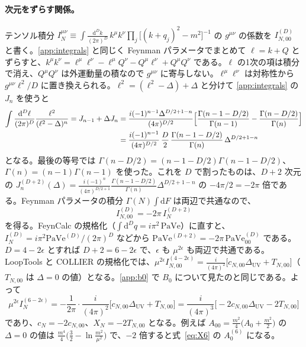 \documentclass[a4paper,10pt]{ltjsarticle}
\newcommand{\dd}{\mathrm{d}}
\begin{document}
\paragraph{次元をずらす関係。}テンソル積分 $I_N^{\mu\nu}\equiv\int\frac{\dd^Dk}{(2\pi)^D}\,k^\mu k^\nu\prod_j\bigl[(k+q_j)^2-m^2\bigr]^{-1}$ の $g^{\mu\nu}$ の係数を $I_{N,00}^{(D)}$ と書く。\ref{app:integrals} と同じく Feynman パラメータでまとめて $\ell=k+Q$ とずらすと、$k^\mu k^\nu=\ell^\mu\ell^\nu-\ell^\mu Q^\nu-Q^\mu\ell^\nu+Q^\mu Q^\nu$ である。$\ell$ の1次の項は積分で消え、$Q^\mu Q^\nu$ は外運動量の積なので $g^{\mu\nu}$ に寄与しない。$\ell^\mu\ell^\nu$ は対称性から $g^{\mu\nu}\ell^2/D$ に置き換えられる。$\ell^2=(\ell^2-\Delta)+\Delta$ と分けて \ref{app:integrals} の $J_n$ を使うと
\begin{align*}
\int\frac{\dd^D\ell}{(2\pi)^D}\frac{\ell^2}{(\ell^2-\Delta)^n}=J_{n-1}+\Delta J_n
&=\frac{i(-1)^{n-1}\Delta^{D/2+1-n}}{(4\pi)^{D/2}}\Bigl[\frac{\Gamma(n-1-D/2)}{\Gamma(n-1)}-\frac{\Gamma(n-D/2)}{\Gamma(n)}\Bigr]\\
&=\frac{i(-1)^{n-1}}{(4\pi)^{D/2}}\,\frac{D}{2}\,\frac{\Gamma(n-1-D/2)}{\Gamma(n)}\,\Delta^{D/2+1-n}
\end{align*}
となる。最後の等号では $\Gamma(n-D/2)=(n-1-D/2)\Gamma(n-1-D/2)$、$\Gamma(n)=(n-1)\Gamma(n-1)$ を使った。これを $D$ で割ったものは、$D+2$ 次元の $J_n^{(D+2)}(\Delta)=\frac{i(-1)^n}{(4\pi)^{D/2+1}}\frac{\Gamma(n-1-D/2)}{\Gamma(n)}\Delta^{D/2+1-n}$ の $-4\pi/2=-2\pi$ 倍である。Feynman パラメータの積分 $\Gamma(N)\int\dd F$ は両辺で共通なので、
\begin{equation*}
I_{N,00}^{(D)}=-2\pi\,I_N^{(D+2)}
\end{equation*}
を得る。FeynCalc の規格化（$\int\dd^Dq=i\pi^2\,\mathrm{PaVe}$）に直すと、$I_N^{(D)}=i\pi^2\mathrm{PaVe}^{(D)}/(2\pi)^D$ などから $\mathrm{PaVe}^{(D+2)}=-2\pi\,\mathrm{PaVe}_{00}^{(D)}$ である。$D=4-2\epsilon$ とすれば $D+2=6-2\epsilon$ で、$\epsilon$ も $\mu^{2\epsilon}$ も両辺で共通である。LoopTools と COLLIER の規格化では、$\mu^{2\epsilon}I_{N,00}^{(4-2\epsilon)}=\frac{i}{(4\pi)^2}\bigl[c_{N,00}\Delta_{\mathrm{UV}}+T_{N,00}\bigr]$（$T_{N,00}$ は $\Delta=0$ の値）となる。\ref{app:b0} で $B_0$ について見たのと同じである。よって
\begin{equation*}
\mu^{2\epsilon}I_N^{(6-2\epsilon)}=-\frac{1}{2\pi}\cdot\frac{i}{(4\pi)^2}\bigl[c_{N,00}\Delta_{\mathrm{UV}}+T_{N,00}\bigr]=\frac{i}{(4\pi)^3}\bigl[-2c_{N,00}\Delta_{\mathrm{UV}}-2T_{N,00}\bigr]
\end{equation*}
であり、$c_N=-2c_{N,00}$、$X_N=-2T_{N,00}$ となる。例えば $A_{00}=\frac{m^2}{4}\bigl(A_0+\frac{m^2}{2}\bigr)$ の $\Delta=0$ の値は $\frac{m^4}{4}\bigl(\frac32-\ln\frac{m^2}{\mu^2}\bigr)$ で、$-2$ 倍すると式~\eqref{eq:X6} の $A_0^{(6)}$ になる。
\end{document}
